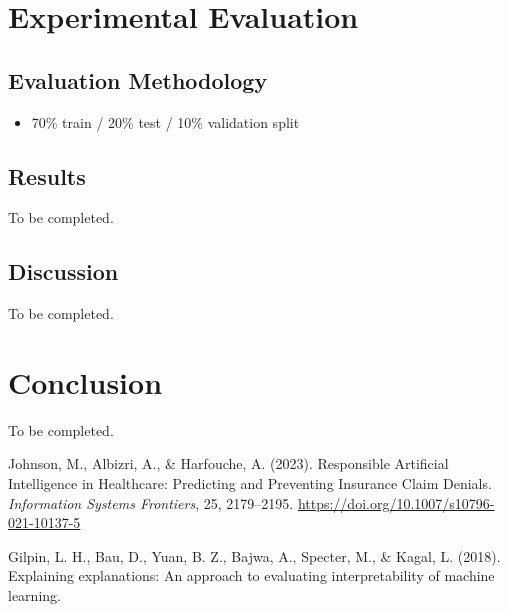 \documentclass[final]{article}
\begin{document}
\section{Experimental Evaluation}

\subsection{Evaluation Methodology}
\begin{itemize}
  \item 70\% train / 20\% test / 10\% validation split
\end{itemize}

\subsection{Results}
To be completed.

\subsection{Discussion}
To be completed.

\section{Conclusion}
To be completed.




\begin{thebibliography}{9}

Johnson, M., Albizri, A., \& Harfouche, A. (2023).
Responsible Artificial Intelligence in Healthcare: Predicting and Preventing Insurance Claim Denials.
\textit{Information Systems Frontiers}, 25, 2179–2195. \url{https://doi.org/10.1007/s10796-021-10137-5}

Gilpin, L. H., Bau, D., Yuan, B. Z., Bajwa, A., Specter, M., \& Kagal, L. (2018).
Explaining explanations: An approach to evaluating interpretability of machine learning.

\end{thebibliography}
\end{document}
